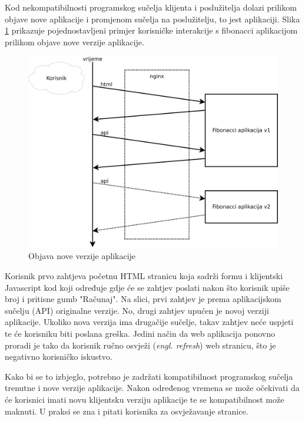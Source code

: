 Kod nekompatibilnosti programskog sučelja klijenta i poslužitelja dolazi prilikom objave nove
aplikacije i promjenom sučelja na poslužitelju, to jest aplikaciji. Slika \ref{fig:04request_flow}
prikazuje pojednostavljeni primjer korisničke interakcije s fibonacci aplikacijom prilikom objave
nove verzije aplikacije.

\begin{figure}[h]
    \centering
    \includegraphics[width=\textwidth]{img/04/request_flow.png}
    \caption{Objava nove verzije aplikacije}%
    \label{fig:04request_flow}
\end{figure}

Korisnik prvo zahtjeva početnu HTML stranicu koja sadrži formu i klijentski Javascript kod koji
određuje gdje će se zahtjev poslati nakon što korisnik upiše broj i pritisne gumb "Računaj". Na
slici, prvi zahtjev je prema aplikacijskom sučelju (API) originalne verzije. No, drugi zahtjev
upućen je novoj verziji aplikacije. Ukoliko nova verzija ima drugačije sučelje, takav zahtjev neće
uspjeti te će korisniku biti poslana greška. Jedini način da web aplikacija ponovno proradi je tako
da korisnik ručno osvježi (\textit{engl. refresh}) web stranicu, što je negativno korisničko
iskustvo.

Kako bi se to izbjeglo, potrebno je zadržati kompatibilnost programskog sučelja trenutne i nove
verzije aplikacije. Nakon određenog vremena se može očekivati da će korisnici imati novu klijentsku
verziju aplikacije te se kompatibilnost može maknuti. U praksi se zna i pitati korisnika za
osvježavanje stranice.

